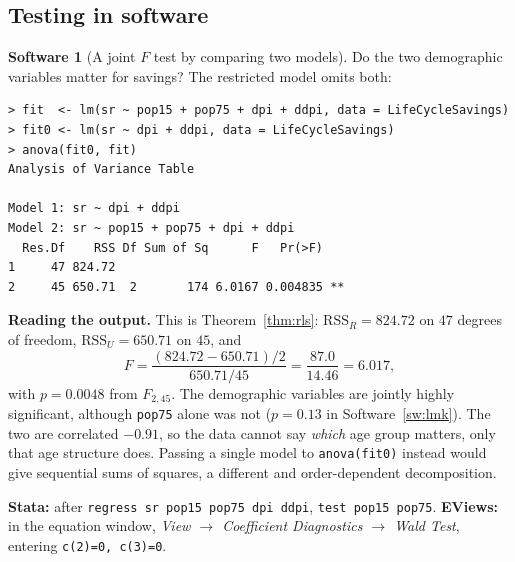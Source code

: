 \documentclass[11pt,a4paper]{article}
\numberwithin{equation}{section}
\theoremstyle{definition}
\newtheorem{software}[thm]{Software}
\begin{document}
\subsection{Testing in software}
\label{ssec:software7}

\begin{software}[A joint $F$ test by comparing two models]
\label{sw:ftest}
Do the two demographic variables matter for savings? The restricted model omits both:
{\small\begin{verbatim}
> fit  <- lm(sr ~ pop15 + pop75 + dpi + ddpi, data = LifeCycleSavings)
> fit0 <- lm(sr ~ dpi + ddpi, data = LifeCycleSavings)
> anova(fit0, fit)
Analysis of Variance Table

Model 1: sr ~ dpi + ddpi
Model 2: sr ~ pop15 + pop75 + dpi + ddpi
  Res.Df    RSS Df Sum of Sq      F   Pr(>F)
1     47 824.72
2     45 650.71  2       174 6.0167 0.004835 **
\end{verbatim}}
\textbf{Reading the output.} This is Theorem~\ref{thm:rls}: $\text{RSS}_R = 824.72$ on $47$ degrees of freedom, $\text{RSS}_U = 650.71$ on $45$, and
\[
F = \frac{(824.72 - 650.71)/2}{650.71/45} = \frac{87.0}{14.46} = 6.017 ,
\]
with $p = 0.0048$ from $F_{2,45}$. The demographic variables are jointly highly significant, although \texttt{pop75} alone was not ($p = 0.13$ in
Software~\ref{sw:lmk}). The two are correlated $-0.91$, so the data cannot say \emph{which} age group matters, only that age structure does.
Passing a single model to \texttt{anova(fit0)} instead would give sequential sums of squares, a different and order-dependent decomposition.

\textbf{Stata:} after \texttt{regress sr pop15 pop75 dpi ddpi}, \texttt{test pop15 pop75}. \textbf{EViews:} in the equation window,
\emph{View $\to$ Coefficient Diagnostics $\to$ Wald Test}, entering \texttt{c(2)=0, c(3)=0}.
\end{software}
\end{document}
